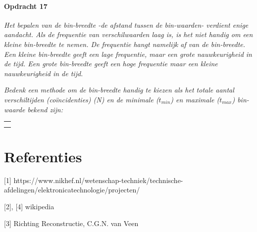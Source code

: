 \begin{minipage}[t]{1\columnwidth}%

\paragraph{Opdracht 17}

\textit{Het bepalen van de bin-breedte -de afstand tussen de bin-waarden-
verdient enige aandacht. Als de frequentie van verschilwaarden laag
is, is het niet handig om een kleine bin-breedte te nemen. De frequentie
hangt namelijk af van de bin-breedte. Een kleine bin-breedte geeft
een lage frequentie, maar een grote nauwkeurigheid in de tijd. Een
grote bin-breedte geeft een hoge frequentie maar een kleine nauwkeurigheid
in de tijd.}

\textit{Bedenk een methode om de bin-breedte handig te kiezen als
het totale aantal verschiltijden (coïncidenties) (N) en de minimale
($t_{min}$) en maximale ($t_{max}$) bin-waarde bekend zijn:}

\begin{tabular}{>{\raggedright}p{16.6cm}}
\tabularnewline
\hline 
\tabularnewline
\hline 
\tabularnewline
\hline 
\tabularnewline
\hline 
\end{tabular}%
\end{minipage}


\section*{Referenties}

{[}1{]} https://www.nikhef.nl/wetenschap-techniek/technische-afdelingen/elektronicatechnologie/projecten/

{[}2{]}, {[}4{]} wikipedia

{[}3{]} Richting Reconstructie, C.G.N. van Veen

